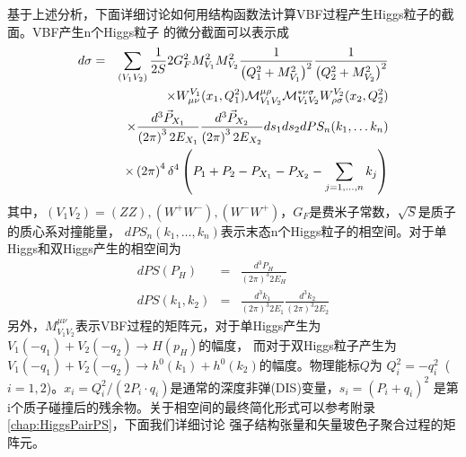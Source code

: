 基于上述分析，下面详细讨论如何用结构函数法计算VBF过程产生Higgs粒子的截面。VBF产生n个Higgs粒子
的微分截面可以表示成\cite{SF:Han,big-vbf}
\begin{eqnarray}
d\sigma
&=&
\sum_{(V_1 V_2)}
\frac{1}{2 S} 2 G_F^2 M^2_{V_1} M^2_{V_2}
\frac{1}{\left( Q^2_1 + M^2_{V_1} \right)^2}
\frac{1}{\left( Q^2_2 + M^2_{V_2} \right)^2} 
\nonumber \\
&& \times
W_{\mu \nu}^{V_1}(x_1, Q^2_1)
{\cal M}^{\mu \rho}_{V_1 V_2}
{\cal M}^{\ast \nu \sigma}_{V_1 V_2}
W_{\rho \sigma}^{V_2}(x_2, Q^2_2) \nonumber \\
&&
\times
\frac{d^3 \vec{P}_{X_1}}{\left( 2 \pi \right)^3 2 E_{X_1}}
\frac{d^3 \vec{P}_{X_2}}{\left( 2 \pi \right)^3 2 E_{X_2}}
d s_1 d s_2
d PS_n(k_1,\ldots k_n)
\nonumber \\
&& \times
\left( 2 \pi \right)^4 \delta^4 \left( P_1 + P_2 - P_{X_1} - P_{X_2} - \sum_{j=1,\ldots,n} k_j \right)
\label{eq:sfapproach}
\end{eqnarray}
其中，$(V_1 V_2) = (ZZ), (W^+W^-), (W^-W^+)$，$G_F$是费米子常数，$\sqrt{S}$是质子的质心系对撞能量，
$dPS_n(k_1,\ldots,k_n)$表示末态n个Higgs粒子的相空间。对于单Higgs和双Higgs产生的相空间为
\begin{eqnarray}
dPS(P_H) &=& \frac{d^3P_H}{(2\pi)^3 2 E_H} \nonumber \\
dPS(k_1,k_2) &=& \frac{d^3k_1}{(2\pi)^3 2 E_1} \frac{d^3k_2}{(2\pi)^3 2 E_2}
\end{eqnarray}
另外，$M^{\mu\nu}_{V_1V_2}$表示VBF过程的矩阵元，对于单Higgs产生为$V_1(-q_1) + V_2(-q_2)\to H(p_H)$的幅度，
而对于双Higgs粒子产生为$V_1(-q_1) + V_2(-q_2)\to h^0(k_1) + h^0(k_2)$的幅度。物理能标$Q$为
$Q^2_i = -q^2_i$~($i=1,2$)。$x_i = Q^2_i/(2P_i\cdot q_i)$是通常的深度非弹(DIS)变量，$s_i = (P_i+q_i)^2$
是第i个质子碰撞后的残余物。关于相空间的最终简化形式可以参考附录\ref{chap:HiggsPairPS}，下面我们详细讨论
强子结构张量和矢量玻色子聚合过程的矩阵元。


